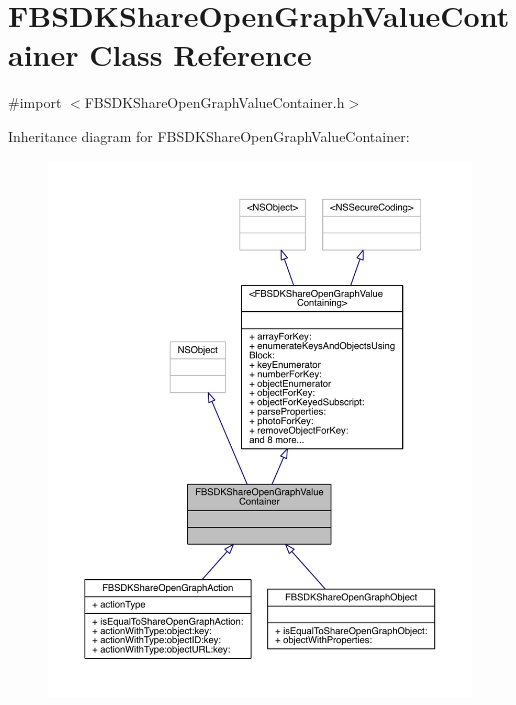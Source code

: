 \hypertarget{interface_f_b_s_d_k_share_open_graph_value_container}{\section{F\-B\-S\-D\-K\-Share\-Open\-Graph\-Value\-Container Class Reference}
\label{interface_f_b_s_d_k_share_open_graph_value_container}
}


{\ttfamily \#import $<$F\-B\-S\-D\-K\-Share\-Open\-Graph\-Value\-Container.\-h$>$}



Inheritance diagram for F\-B\-S\-D\-K\-Share\-Open\-Graph\-Value\-Container\-:
\nopagebreak
\begin{figure}[H]
\begin{center}
\leavevmode
\includegraphics[width=350pt]{interface_f_b_s_d_k_share_open_graph_value_container__inherit__graph}
\end{center}
\end{figure}


